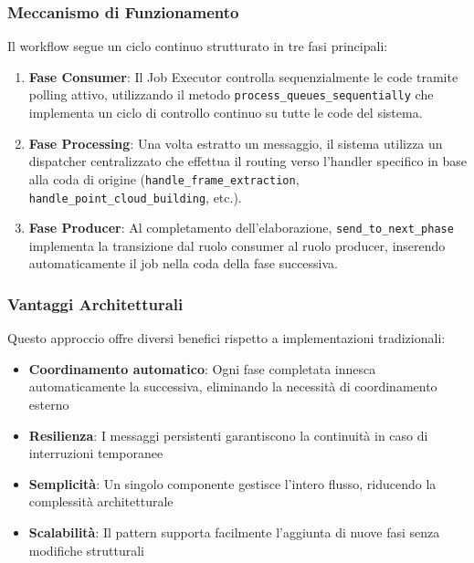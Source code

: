 \subsubsection{Meccanismo di Funzionamento}

Il workflow segue un ciclo continuo strutturato in tre fasi principali:

\begin{enumerate}
	\item \textbf{Fase Consumer}: Il Job Executor controlla sequenzialmente le code tramite polling attivo, utilizzando il metodo \texttt{process\_queues\_sequentially} che implementa un ciclo di controllo continuo su tutte le code del sistema.
	
	\item \textbf{Fase Processing}: Una volta estratto un messaggio, il sistema utilizza un dispatcher centralizzato che effettua il routing verso l'handler specifico in base alla coda di origine (\texttt{handle\_frame\_extraction}, \texttt{handle\_point\_cloud\_building}, etc.).
	
	\item \textbf{Fase Producer}: Al completamento dell'elaborazione, \texttt{send\_to\_next\_phase} implementa la transizione dal ruolo consumer al ruolo producer, inserendo automaticamente il job nella coda della fase successiva.
\end{enumerate}
\newpage
\subsubsection{Vantaggi Architetturali}

Questo approccio offre diversi benefici rispetto a implementazioni tradizionali:

\begin{itemize}
	\item \textbf{Coordinamento automatico}: Ogni fase completata innesca automaticamente la successiva, eliminando la necessità di coordinamento esterno
	\item \textbf{Resilienza}: I messaggi persistenti garantiscono la continuità in caso di interruzioni temporanee
	\item \textbf{Semplicità}: Un singolo componente gestisce l'intero flusso, riducendo la complessità architetturale
	\item \textbf{Scalabilità}: Il pattern supporta facilmente l'aggiunta di nuove fasi senza modifiche strutturali
\end{itemize}

